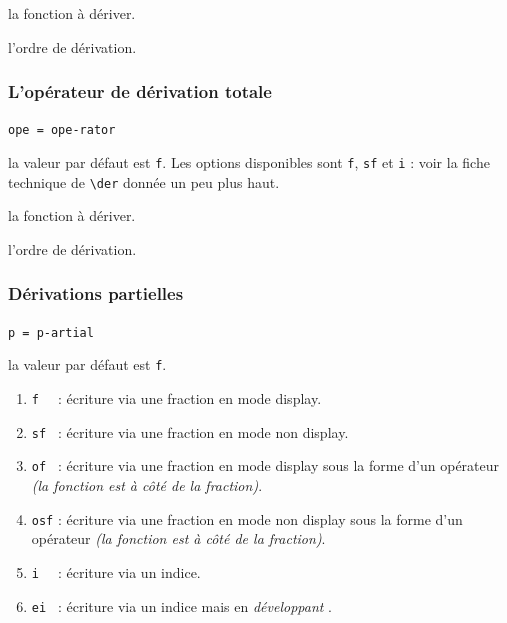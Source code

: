 \documentclass[12pt,a4paper]{book}
\newcommand\env[1]{\texttt{#1}}
\newcommand\macro[1]{\env{\textbackslash{}#1}}
\theoremstyle{definition}
\newcommand\mwhyprefix[2]{%
	\texttt{#1 = #1-#2}%
}
\begin{document}
{{ la fonction à dériver.

 l'ordre de dérivation.




\subsubsection{L'opérateur de dérivation totale} \label{tnsana-ope-total-der}



 \hfill \mwhyprefix{ope}{rator}

\IDoption{} la valeur par défaut est \verb+f+. Les options disponibles sont \verb+f+, \verb+sf+ et \verb+i+ : voir la fiche technique de \macro{der} donnée un peu plus haut.

 la fonction à dériver.

 l'ordre de dérivation.


\subsubsection{Dérivations partielles}



 \hfill \mwhyprefix{p}{artial}

\IDoption{} la valeur par défaut est \verb+f+. 
\begin{enumerate}
	\item \verb+f  + : écriture via une fraction en mode display.

	\item \verb+sf + : écriture via une fraction en mode non display.

	\item \verb+of + : écriture via une fraction en mode display sous la forme d'un opérateur \emph{(la fonction est à côté de la fraction)}.

	\item \verb+osf+ : écriture via une fraction en mode non display sous la forme d'un opérateur \emph{(la fonction est à côté de la fraction)}.

	\medskip

	\item \verb+i  + : écriture via un indice.

	\item \verb+ei + : écriture via un indice mais en \emph{\og développant \fg}.

	\medskip


\end{enumerate}}}
\end{document}
